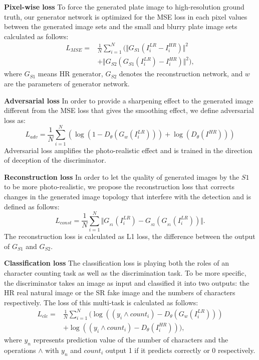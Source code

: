 \documentclass[a4paper,twoside]{article}
\begin{document}
    \textbf{Pixel-wise loss} To force the generated plate image to high-resolution ground truth, our generator network is optimized for the MSE loss in each pixel values between the generated image sets and the small and blurry plate image sets calculated as follows:
\begin{equation}
    	    \begin{split}
        	    L_{MSE} = &\frac{1}{N}\sum_{i=1}^{N}(\Vert{G_{S1}}(I_i^{LR} - I_i^{HR})\Vert^2 \\
        	    & + \Vert G_{S2}({G_{S1}}(I_i^{LR}) - I_i^{HR})\Vert^2),
    	    \end{split}
    	\end{equation}
    where $G_{{S1}}$ means HR generator, $G_{{S2}}$ denotes the reconstruction network, and $w$ are the parameters of generator network.
    
    \textbf{Adversarial loss} In order to provide a sharpening effect to the generated image different from the MSE loss that gives the smoothing effect, we define adversarial loss as:
\begin{equation}
        	L_{adv} = { \frac{1}{N}\sum_{i=1}^N(\log(1 - D_{\theta}(G_w(I_i^{LR}))) + \log(D_{\theta}(I^{HR})))}
    	\end{equation}
    Adversarial loss amplifies the photo-realistic effect and is trained in the direction of deception of the discriminator.
    
    \textbf{Reconstruction loss} In order to let the quality of generated images by the $S1$ to be more photo-realistic, we propose the reconstruction loss that corrects changes in the generated image topology that interfere with the detection and is defined as follows:
\begin{equation}
        	L_{const} = \frac{1}{N}\sum_{i=1}^N{\Vert{G_{_{S1}}(I_i^{LR})} - G_{_{S2}}(G_{_{S1}}(I_i^{LR})) \Vert}.
    	\end{equation}
    The reconstruction loss is calculated as L1 loss, the difference between the output of $G_{S1}$ and $G_{S2}$.
    
    \textbf{Classification loss} The classification loss is playing both the roles of an character counting task as well as the discrimination task. To be more specific, the discriminator takes an image as input and classified it into two outputs: the HR real natural image or the SR fake image and the numbers of characters respectively. The loss of this multi-task is calculated as follows:
\begin{equation}
    	\begin{split}
        	L_{clc} = &\frac{1}{N}\sum_{i=1}^N(\log((y_i \wedge count_i) - D_{\theta}(G_w(I_i^{LR}))) \\
        	&+ \log((y_i \wedge count_i) - D_{\theta}(I_i^{HR}))),
    	\end{split}
    	\end{equation}
    where $y_n$ represents prediction value of the number of characters and the operations $\wedge$ with $y_n$ and $count_i$ output 1 if it predicts correctly or 0 respectively.
\end{document}
